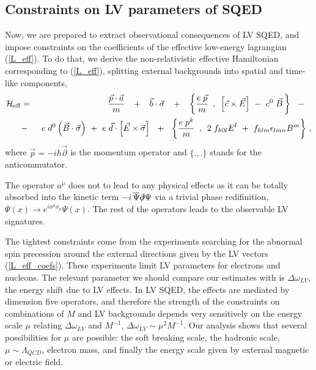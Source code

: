 \documentclass[12pt]{revtex4}
\newcommand{\slashed}[1]{\hbox{{$#1$}\llap{$/$}}}
\begin{document}
\subsection{Constraints on LV parameters of SQED}

Now, we are prepared to extract observational consequences of LV SQED,
and impose constraints on the
coefficients of the effective low-energy lagrangian
(\ref{L_eff}). To do that, we derive the non-relativistic
effective Hamiltonian corresponding to (\ref{L_eff}),
splitting external backgrounds into spatial and  time-like components,
\begin{eqnarray}
\label{H_eff}
	\mathcal{H}_{\rm eff} 
	& = &
	~~
	\frac{\vec{p} \cdot \vec{a}}
                  {m}
	~~\,+~~\,
	\vec{b} \cdot \vec{\sigma}
	~~\,+~~\,
	\biggl\{
		\frac{e\; \vec{p}}
                    {m}
		\,~,~\,
		\left[ \vec{c} \times \vec{E} \right]
		~-~
		c^0\; \vec{B}
		\,
	\biggr\}
	~~\,-~~\,
	\\
\nonumber
	& - &
	~
	e \; d^0 \left( \vec{B} \cdot \vec{\sigma} \right)
	~+~
	e\; \vec{d} \cdot
	\left[ \vec{E} \times \vec{\sigma} \right]
	~~+~~	
	\biggl\{
		\frac{e\; p^k}
                    {m}
		\,~,~\,
		2\; f_{k0l} E^l 
		~+~
		f_{klm} \epsilon_{lmn}
		B^m
	\biggr\}~,
\end{eqnarray}
	where $ \vec{p} = - i \hbar \vec{\partial} $ is the momentum operator and $\{.,.\}$
	stands for the anticommutator. 

The operator $ a^\mu $ does not to lead to
any physical effects as it can be totally absorbed into
the kinetic term 
$ - i\, \overline{\Psi}\slashed{\partial}\Psi $
via a trivial phase redifinition, $ \Psi(x) \to e^{i a^\mu x_\mu} \Psi(x) $.
The rest of the operators leads to the observable LV signatures. 

The tightest constraints come from the experiments searching for the 
abnormal spin precession around the external directions given by the
LV vectors (\ref{L_eff_coefs}). These experiments limit LV parameters 
for electrons and nucleons. The relevant parameter we should compare 
our estimates with is $\Delta \omega_{LV}$, the energy shift due to 
LV effects. In LV SQED, the effects are mediated by dimension 
five operators, and therefore the strength of the constraints on 
combinations of $M$ and LV backgrounds depends very sensitively on the 
energy scale $\mu$ relating $\Delta \omega_{LV}$ and $M^{-1}$, 
$\Delta \omega_{LV} \sim \mu^2 M^{-1}$. Our analysis shows that 
several possibilities for $\mu$ are possible: the soft breaking scale, 
the hadronic scale, $\mu \sim \Lambda_{QCD}$, electron mass, and 
finally the energy scale given by external magnetic or electric field. 
\end{document}
